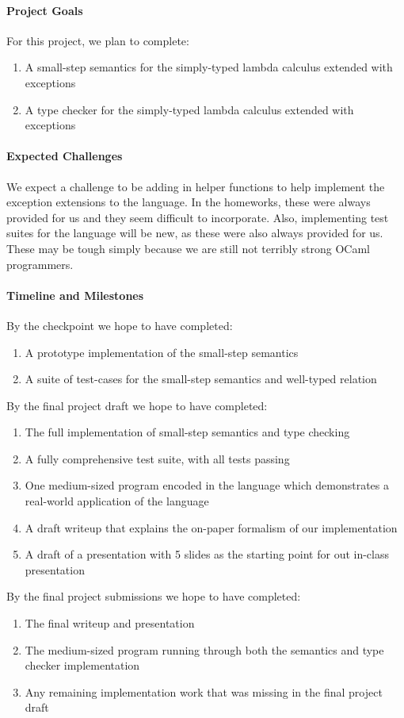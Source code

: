 \documentclass{article}
\begin{document}
\paragraph{Project Goals}
For this project, we plan to complete:
\begin{enumerate}
\item A small-step semantics for the simply-typed lambda calculus extended with exceptions
\item A type checker for the simply-typed lambda calculus extended with exceptions
\end{enumerate}

\paragraph{Expected Challenges}
We expect a challenge to be adding in helper functions to help implement the exception extensions to the language. In the homeworks, these were always provided for us and they seem difficult to incorporate. Also, implementing test suites for the language will be new, as these were also always provided for us. These may be tough simply because we are still not terribly strong OCaml programmers.

\paragraph{Timeline and Milestones}

By the checkpoint we hope to have completed:
\begin{enumerate}
\item A prototype implementation of the small-step semantics
\item A suite of test-cases for the small-step semantics and well-typed relation
\end{enumerate}

\noindent
By the final project draft we hope to have completed:
\begin{enumerate}
\item The full implementation of small-step semantics and type checking
\item A fully comprehensive test suite, with all tests passing
\item One medium-sized program encoded in the language which demonstrates a real-world application of the language
\item A draft writeup that explains the on-paper formalism of our implementation
\item A draft of a presentation with 5 slides as the starting point for out in-class presentation
\end{enumerate}

\noindent
By the final project submissions we hope to have completed:
\begin{enumerate}
\item The final writeup and presentation
\item The medium-sized program running through both the semantics and type checker implementation
\item Any remaining implementation work that was missing in the final project draft
\end{enumerate}
\end{document}
